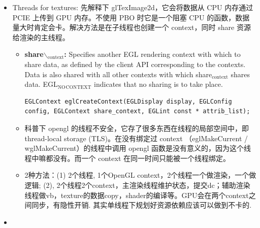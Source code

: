 \documentclass[9pt,b5paper]{article}
\begin{document}
\begin{enumerate}
\begin{itemize}
\item Threads for textures: 先解释下 glTexImage2d，它会将数据从 CPU 内存通过 PCIE 上传到 GPU 内存。不使用 PBO 时它是一个阻塞 CPU 的函数，数据量大时肯定会卡。解决方法是在子线程也创建一个 context，同时 share 资源给渲染的主线程。 
\begin{itemize}
\item \textbf{share$\backslash$$_{\text{context}}$:} Specifies another EGL rendering context with which to share data, as defined by the client API corresponding to the contexts. Data is also shared with all other contexts with which share$_{\text{context}}$ shares data. EGL$_{\text{NO}}$$_{\text{CONTEXT}}$ indicates that no sharing is to take place.

\lstset{language=c++,label= ,caption= ,numbers=none}
\begin{lstlisting}
EGLContext eglCreateContext(EGLDisplay display, EGLConfig config, EGLContext share_context, EGLint const * attrib_list);
\end{lstlisting}
\item 科普下 opengl 的线程不安全，它存了很多东西在线程的局部空间中，即 thread-local storage (TLS)。在没有绑定过 context （eglMakeCurrent / wglMakeCurrent）的线程中调用 opengl 函数是没有意义的，因为这个线程中嘛都没有。而一个 context 在同一时间只能被一个线程绑定。
\item 2种方法：(1) 2个线程, 1个OpenGL context，2个线程一个做渲染，一个做逻辑; (2), 2个线程2个context，主渲染线程维护状态，提交dc；辅助渲染线程做vb，texture的数据copy，shader的编译等。GPU会在两个context之间同步，有隐性开销. 其实单线程下规划好资源依赖应该可以做到不卡的.
\end{itemize}
\item 
\end{itemize}


\end{enumerate}
\end{document}
